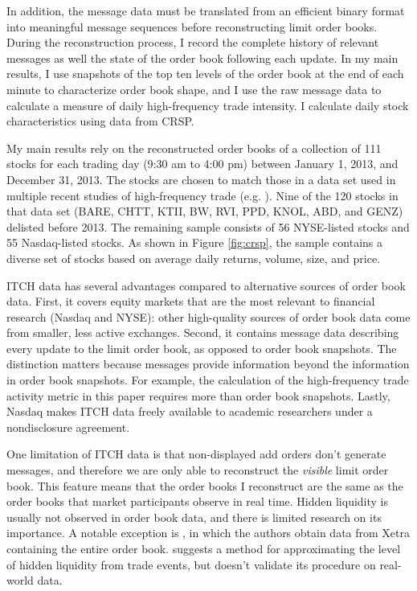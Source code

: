 	In addition, the message data must be translated from an efficient binary format into meaningful message sequences before reconstructing limit order books. During the reconstruction process, I record the complete history of relevant messages as well the state of the order book following each update. In my main results, I use snapshots of the top ten levels of the order book at the end of each minute to characterize order book shape, and I use the raw message data to calculate a measure of daily high-frequency trade intensity. I calculate daily stock characteristics using data from CRSP.

	My main results rely on the reconstructed order books of a collection of 111 stocks for each trading day (9:30 am to 4:00 pm) between January 1, 2013, and December 31, 2013. The stocks are chosen to match those in a data set used in multiple recent studies of high-frequency trade (e.g. \citet{Brogaard2014}). Nine of the 120 stocks in that data set (BARE, CHTT, KTII, BW, RVI, PPD, KNOL, ABD, and GENZ) delisted before 2013. The remaining sample consists of 56 NYSE-listed stocks and 55 Nasdaq-listed stocks. As shown in Figure \ref{fig:crsp}, the sample contains a diverse set of stocks based on average daily returns, volume, size, and price.




	ITCH data has several advantages compared to alternative sources of order book data. First, it covers equity markets that are the most relevant to financial research (Nasdaq and NYSE): other high-quality sources of order book data come from smaller, less active exchanges. Second, it contains message data describing every update to the limit order book, as opposed to order book snapshots. The distinction matters because messages provide information beyond the information in order book snapshots. For example, the calculation of the high-frequency trade activity metric in this paper requires more than order book snapshots. Lastly, Nasdaq makes ITCH data freely available to academic researchers under a nondisclosure agreement.

	One limitation of ITCH data is that non-displayed add orders don't generate messages, and therefore we are only able to reconstruct the \textit{visible} limit order book. This feature means that the order books I reconstruct are the same as the order books that market participants observe in real time. Hidden liquidity is usually not observed in order book data, and there is limited research on its importance. A notable exception is \citet{Beltran-Lopez2009}, in which the authors obtain data from Xetra containing the entire order book. \citet{Avellaneda2011} suggests a method for approximating the level of hidden liquidity from trade events, but doesn't validate its procedure on real-world data.

